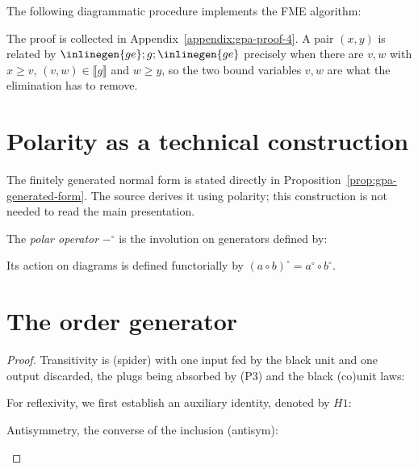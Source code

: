 \begin{proposition}\label{prop:fme}
    The following diagrammatic procedure implements the FME algorithm:
    \begin{figure}[H]
        \centering
        
    \end{figure}
\end{proposition}

\noindent The proof is collected in Appendix~\ref{appendix:gpa-proof-4}.
A pair $(x,y)$ is related by $\inlinegen{ge};g;\inlinegen{ge}$ precisely when
there are $v,w$ with $x\ge v$, $(v,w)\in\llbracket g\rrbracket$ and $w\ge y$,
so the two bound variables $v,w$ are what the elimination has to remove.


\section{Polarity as a technical construction}

The finitely generated normal form is stated directly in
Proposition~\ref{prop:gpa-generated-form}. The source derives it using
polarity; this construction is not needed to read the main presentation.

\begin{definition}
    The \emph{polar operator} $-^\circ$ is the involution on generators
    defined by:
    \begin{figure}[H]
        \centering
        
    \end{figure}
    Its action on diagrams is defined functorially by
    $(a \circ b)^\circ = a^\circ \circ b^\circ$.
\end{definition}

\section{The order generator}\label{appendix:gpa-proof-1}

\begin{proof}
    Transitivity is (spider) with one input fed by the black unit and one
    output discarded, the plugs being absorbed by (P3) and the black
    (co)unit laws:
    

    \noindent For reflexivity, we first establish an auxiliary identity, denoted by $H1$:
    \begin{center}
        
    \end{center}

    \noindent Antisymmetry, the converse of the inclusion (antisym):
    \begin{center}
        
    \end{center}
\end{proof}

